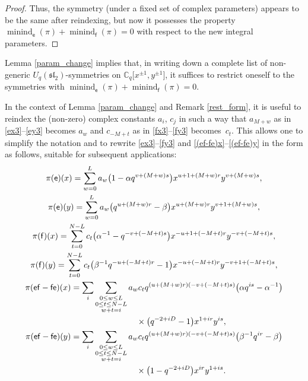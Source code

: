 \documentclass[10pt,a4paper]{amsart}
\numberwithin{equation}{section}
\begin{document}
\begin{proof}
Thus, the symmetry (under a fixed set of complex parameters) appears to be the same after reindexing, but now it possesses the property $\operatorname{minind}_\mathsf{e}(\pi)+
\operatorname{minind}_\mathsf{f}(\pi)=0$ with respect to the new integral parameters.
\end{proof}

\begin{Remark}\label{rest_form}Lemma \ref{param_change} implies that, in writing down a complete list of non-generic $U_q(\mathfrak{sl}_2)$-symmetries on $\mathbb{C}_q\big[x^{\pm 1},y^{\pm 1}\big]$, it suffices to restrict oneself to the symmetries with $\operatorname{minind}_\mathsf{e}(\pi)+\operatorname{minind}_\mathsf{f}(\pi)=0$.
\end{Remark}

\begin{Remark}
In the context of Lemma \ref{param_change} and Remark \ref{rest_form}, it is useful to reindex the (non-zero) complex constants $a_i$, $c_j$ in such a way that $a_{M+w}$ as in \eqref{ex3}--\eqref{ey3} becomes $a_w$ and $c_{-M+t}$ as in \eqref{fx3}--\eqref{fy3} becomes~$c_t$. This allows one to simplify the notation and to rewrite \eqref{ex3}--\eqref{fy3} and \eqref{(ef-fe)x}--\eqref{(ef-fe)y} in the form as follows, suitable for subsequent applications:
\begin{gather}
\pi(\mathsf{e})(x) =\sum_{w=0}^La_w\big(1-\alpha q^{v+(M+w)s}\big)x^{u+1+(M+w)r}y^{v+(M+w)s},\label{ex6}\\
 \pi(\mathsf{e})(y) =\sum_{w=0}^La_w\big(q^{u+(M+w)r}-\beta\big)x^{u+(M+w)r}y^{v+1+(M+w)s},\label{ey6}\\
\pi(\mathsf{f})(x) =\sum_{t=0}^{N-L}c_t\big(\alpha^{-1}-q^{-v+(-M+t)s}\big)x^{-u+1+(-M+t)r}y^{-v+(-M+t)s}, \label{fx6}\\
\pi(\mathsf{f})(y) =\sum_{t=0}^{N-L}c_t\big(\beta^{-1}q^{-u+(-M+t)r}-1\big)x^{-u+(-M+t)r}y^{-v+1+(-M+t)s}, \label{fy6}\\
\pi(\mathsf{ef-fe})(x) =\sum_i\sum_{\substack{0\le w\le L\\ 0\le t\le N-L\\ w+t=i}}a_wc_tq^{(u+(M+w)r)(-v+(-M+t)s)}\big(\alpha q^{is}-\alpha^{-1}\big)\nonumber\\
\hphantom{\pi(\mathsf{ef-fe})(x) =}{}\times \big(q^{-2+iD}-1\big) x^{1+ir}y^{is}, \label{(ef-fe)x2}\\
 \pi(\mathsf{ef-fe})(y) =\sum_i\sum_{\substack{0\le w\le L\\ 0\le t\le N-L\\ w+t=i}}a_wc_tq^{(u+(M+w)r)(-v+(-M+t)s)}\big(\beta^{-1}q^{ir}-\beta\big)\nonumber\\
 \hphantom{\pi(\mathsf{ef-fe})(y) =}{}\times \big(1-q^{-2+iD}\big) x^{ir}y^{1+is}. \label{(ef-fe)y2}
\end{gather}
\end{Remark}
\end{document}
